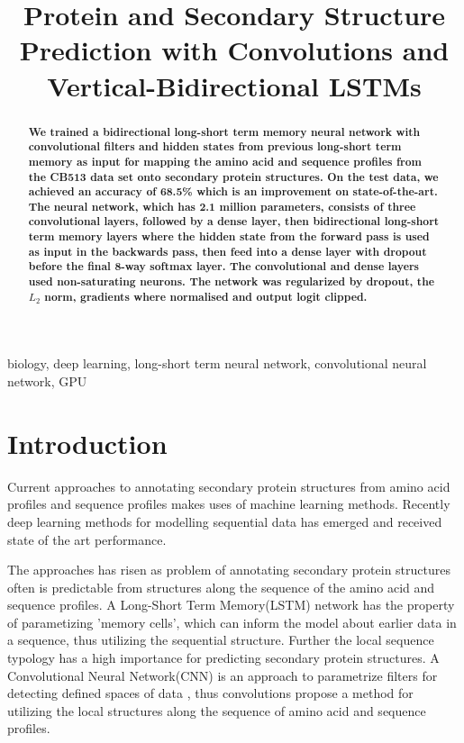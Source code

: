 \documentclass{article}
\title{Protein and Secondary Structure Prediction with Convolutions and Vertical-Bidirectional LSTMs}
\begin{document}
%
\maketitle
%
\begin{abstract}
\textbf{We trained a bidirectional long-short term memory neural network with convolutional filters and hidden states from previous long-short term memory as input for mapping the amino acid and sequence profiles from the CB513 data set onto secondary protein structures. On the test data, we achieved an accuracy of 68.5\% which is an improvement on state-of-the-art. The neural network, which has 2.1 million parameters, consists of three convolutional layers, followed by a dense layer, then bidirectional long-short term memory layers where the hidden state from the forward pass is used as input in the backwards pass, then feed into a dense layer with dropout before the final 8-way softmax layer. The convolutional and dense layers used non-saturating neurons. The network was regularized by dropout, the $L_2$ norm, gradients where normalised and output logit clipped.}
\end{abstract}
%
\begin{keywords}
biology, deep learning, long-short term neural network, convolutional neural network, GPU
\end{keywords}
%
\section{Introduction}
\label{sec:intro}
Current approaches to annotating secondary protein structures from amino acid profiles and sequence profiles makes uses of machine learning methods\cite{zhou2014deep}. Recently deep learning methods for modelling sequential data has emerged and received state of the art performance\cite{sonderby2014protein}.

The approaches has risen as problem of annotating secondary protein structures often is predictable from structures along the sequence of the amino acid and sequence profiles\cite{Oles udtalelse}. A Long-Short Term Memory(LSTM) network has the property of parametizing 'memory cells', which can inform the model about earlier data in a sequence, thus utilizing the sequential structure\cite{Graves2012}. Further the local sequence typology has a high importance for predicting secondary protein structures\cite{Oles udtalelse}. A Convolutional Neural Network(CNN) is an approach to parametrize filters for detecting defined spaces of data \cite{NIPS2012_4824}, thus convolutions propose a method for utilizing the local structures along the sequence of amino acid and sequence profiles.
\end{document}

